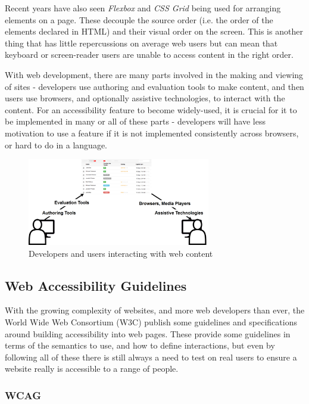 \documentclass[ %
                    author={Aleena Baig},
                supervisor={Dr Simon Lock},
                    degree={BSc},
                     title={On Making Web Accessible Graphs},
                  subtitle={},
                      year={2019} ]{dissertation}
\begin{document}
Recent years have also seen \textit{Flexbox} and \textit{CSS Grid} being used for arranging elements on a page. These decouple the source order (i.e. the order of the elements declared in HTML) and their visual order on the screen. This is another thing that has little repercussions on average web users but can mean that keyboard or screen-reader users are unable to access content in the right order.


With web development, there are many parts involved in the making and viewing of sites - developers use authoring and evaluation tools to make content, and then users use browsers, and optionally assistive technologies, to interact with the content. For an accessibility feature to become widely-used, it is crucial for it to be implemented in many or all of these parts - developers will have less motivation to use a feature if it is not implemented consistently across browsers, or hard to do in a language.

\begin{figure}[h]
\caption{Developers and users interacting with web content}
\includegraphics[width=8cm]{images/W3Components.png}
\centering
\end{figure}

\subsection{Web Accessibility Guidelines}
With the growing complexity of websites, and more web developers than ever, the World Wide Web Consortium (W3C) publish some guidelines and specifications around building accessibility into web pages.
These provide some guidelines in terms of the semantics to use, and how to define interactions, but even by following all of these there is still always a need to test on real users to ensure a website really is accessible to a range of people.

\subsubsection{WCAG}
\end{document}
